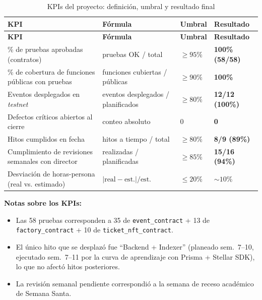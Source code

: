 \documentclass[12pt,oneside]{report}
\begin{document}
      \begin{longtable}{@{}p{5.2cm} p{3.6cm} p{2.8cm} p{2.5cm}@{}}
        \caption{KPIs del proyecto: definición, umbral y resultado final}
        \label{tab:kpis}\\
        \toprule
        \textbf{KPI} & \textbf{Fórmula} & \textbf{Umbral} & \textbf{Resultado}\\
        \midrule
        \endfirsthead
        \toprule
        \textbf{KPI} & \textbf{Fórmula} & \textbf{Umbral} & \textbf{Resultado}\\
        \midrule
        \endhead
        \bottomrule
        \endfoot
        \% de pruebas aprobadas (contratos) & pruebas OK / total & $\geq 95\%$ & \textbf{100\% (58/58)}\\
        \% de cobertura de funciones públicas con pruebas & funciones cubiertas / públicas & $\geq 90\%$ & \textbf{100\%}\\
        Eventos desplegados en \textit{testnet} & eventos desplegados / planificados & $\geq 80\%$ & \textbf{12/12 (100\%)}\\
        Defectos críticos abiertos al cierre & conteo absoluto & $0$ & \textbf{0}\\
        Hitos cumplidos en fecha & hitos a tiempo / total & $\geq 80\%$ & \textbf{8/9 (89\%)}\\
        Cumplimiento de revisiones semanales con director & realizadas / planificadas & $\geq 85\%$ & \textbf{15/16 (94\%)}\\
        Desviación de horas-persona (real vs. estimado) & $|\mathrm{real}-\mathrm{est.}|/\mathrm{est.}$ & $\leq 20\%$ & \textbf{$\sim 10\%$}\\
      \end{longtable}

      \textbf{Notas sobre los KPIs:}
      \begin{itemize}
        \item Las 58 pruebas corresponden a 35 de \texttt{event\_contract} + 13 de \texttt{factory\_contract} + 10 de \texttt{ticket\_nft\_contract}.
        \item El único hito que se desplazó fue ``Backend + Indexer'' (planeado sem.~7--10, ejecutado sem.~7--11 por la curva de aprendizaje con Prisma + Stellar SDK), lo que no afectó hitos posteriores.
        \item La revisión semanal pendiente correspondió a la semana de receso académico de Semana Santa.
      \end{itemize}
\end{document}

